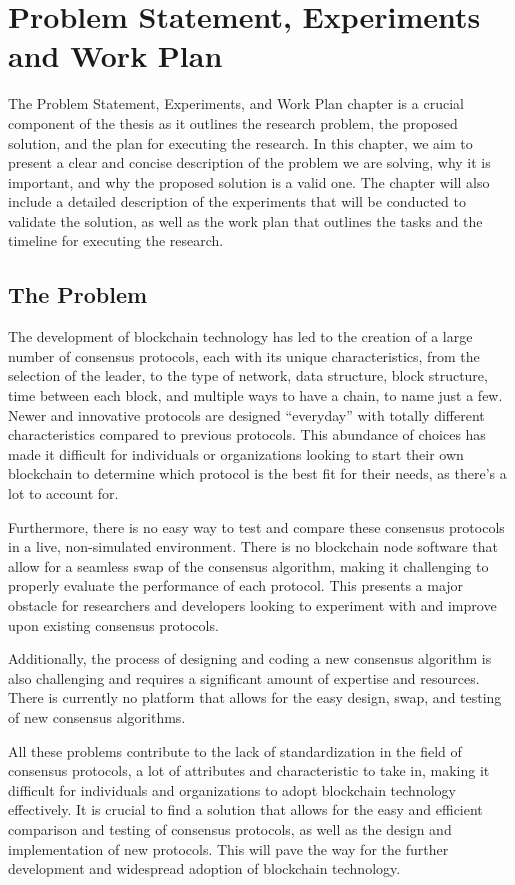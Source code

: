 \chapter{Problem Statement, Experiments and Work Plan}

The Problem Statement, Experiments, and Work Plan chapter is a crucial component of the thesis as it outlines the research problem, the proposed solution, and the plan for executing the research. In this chapter, we aim to present a clear and concise description of the problem we are solving, why it is important, and why the proposed solution is a valid one. The chapter will also include a detailed description of the experiments that will be conducted to validate the solution, as well as the work plan that outlines the tasks and the timeline for executing the research.

\section{The Problem}
The development of blockchain technology has led to the creation of a large number of consensus protocols, each with its unique characteristics, from the selection of the leader, to the type of network, data structure, block structure, time between each block, and multiple ways to have a chain, to name just a few. Newer and innovative protocols are designed ``everyday'' with totally different characteristics compared to previous protocols.
This abundance of choices has made it difficult for individuals or organizations looking to start their own blockchain to determine which protocol is the best fit for their needs, as there's a lot to account for.

Furthermore, there is no easy way to test and compare these consensus protocols in a live, non-simulated environment.
There is no blockchain node software that allow for a seamless swap of the consensus algorithm, making it challenging to properly evaluate the performance of each protocol. This presents a major obstacle for researchers and developers looking to experiment with and improve upon existing consensus protocols.

Additionally, the process of designing and coding a new consensus algorithm is also challenging and requires a significant amount of expertise and resources. There is currently no platform that allows for the easy design, swap, and testing of new consensus algorithms.

All these problems contribute to the lack of standardization in the field of consensus protocols, a lot of attributes and characteristic to take in, making it difficult for individuals and organizations to adopt blockchain technology effectively.
It is crucial to find a solution that allows for the easy and efficient comparison and testing of consensus protocols, as well as the design and implementation of new protocols. This will pave the way for the further development and widespread adoption of blockchain technology.


